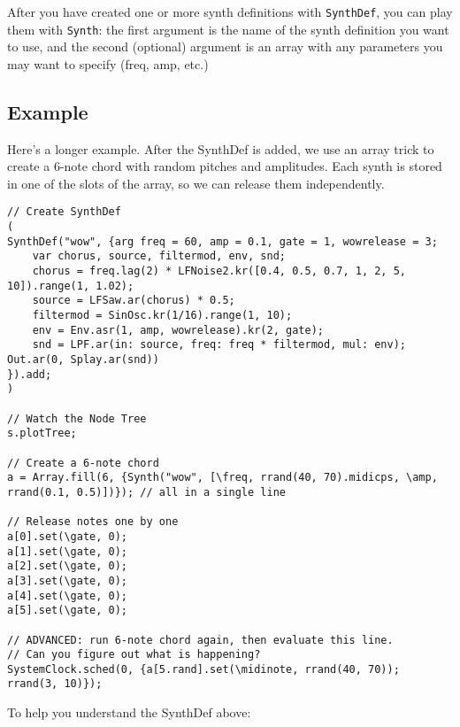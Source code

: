 After you have created one or more synth definitions with \texttt{SynthDef}, you can play them with \texttt{Synth}: the first argument is the name of the synth definition you want to use, and the second (optional) argument is an array with any parameters you may want to specify (freq, amp, etc.)

\subsection{Example}

Here's a longer example. After the SynthDef is added, we use an array trick to create a 6-note chord with random pitches and amplitudes. Each synth is stored in one of the slots of the array, so we can release them independently.

 
\begin{lstlisting}[style=SuperCollider-IDE, basicstyle=\scttfamily\footnotesize]
// Create SynthDef
(
SynthDef("wow", {arg freq = 60, amp = 0.1, gate = 1, wowrelease = 3;
	var chorus, source, filtermod, env, snd;
	chorus = freq.lag(2) * LFNoise2.kr([0.4, 0.5, 0.7, 1, 2, 5, 10]).range(1, 1.02);
	source = LFSaw.ar(chorus) * 0.5;
	filtermod = SinOsc.kr(1/16).range(1, 10);
	env = Env.asr(1, amp, wowrelease).kr(2, gate);
	snd = LPF.ar(in: source, freq: freq * filtermod, mul: env);
Out.ar(0, Splay.ar(snd))
}).add;
)

// Watch the Node Tree
s.plotTree;

// Create a 6-note chord
a = Array.fill(6, {Synth("wow", [\freq, rrand(40, 70).midicps, \amp, rrand(0.1, 0.5)])}); // all in a single line

// Release notes one by one
a[0].set(\gate, 0);
a[1].set(\gate, 0);
a[2].set(\gate, 0);
a[3].set(\gate, 0);
a[4].set(\gate, 0);
a[5].set(\gate, 0);

// ADVANCED: run 6-note chord again, then evaluate this line.
// Can you figure out what is happening?
SystemClock.sched(0, {a[5.rand].set(\midinote, rrand(40, 70)); rrand(3, 10)});
\end{lstlisting}

To help you understand the SynthDef above:

